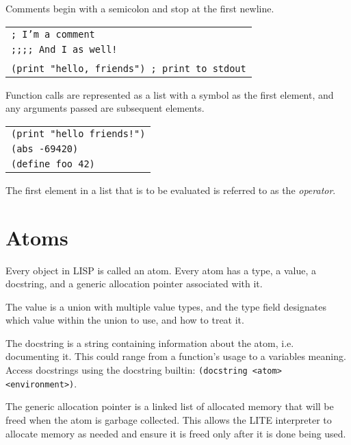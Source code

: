 \documentclass[
letterpaper,
oneside,
]{memoir}
\begin{document}
\filbreak
\noindent
Comments begin with a semicolon and stop at the first newline.

\vspace{1em}
\begin{tabular}{l}
  \texttt{; I'm a comment} \\
  \texttt{;;;; And I as well!} \\
  \\
  \verb|(print "hello, friends") ; print to stdout| \\
\end{tabular}
\vspace{1em}

\filbreak
\noindent
Function calls are represented as a list with a symbol as the first element, and any arguments passed are subsequent elements.

\vspace{1em}
\begin{tabular}{l}
\verb|(print "hello friends!")| \\
\texttt{(abs -69420)} \\
\texttt{(define foo 42)} \\
\end{tabular}
\vspace{1em}

The first element in a list that is to be evaluated is referred to as the \emph{operator}.

\filbreak

\chapter{Atoms}

Every object in LISP is called an atom. Every atom has a type, a value, a docstring, and a generic allocation pointer associated with it.

\vspace{1em}
\noindent
The value is a union with multiple value types, and the type field designates which value within the union to use, and how to treat it.

\vspace{1em}
\noindent
The docstring is a string containing information about the atom, i.e. documenting it. This could range from a function’s usage to a variables meaning. Access docstrings using the docstring builtin: \texttt{(docstring <atom> <environment>)}.

\vspace{1em}
\noindent
The generic allocation pointer is a linked list of allocated memory that will be freed when the atom is garbage collected. This allows the LITE interpreter to allocate memory as needed and ensure it is freed only after it is done being used.
\end{document}
